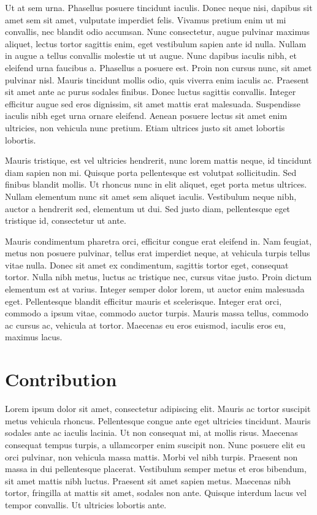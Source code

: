 Ut at sem urna. Phasellus posuere tincidunt iaculis. Donec neque nisi, dapibus sit amet sem sit amet, vulputate imperdiet felis. Vivamus pretium enim ut mi convallis, nec blandit odio accumsan. Nunc consectetur, augue pulvinar maximus aliquet, lectus tortor sagittis enim, eget vestibulum sapien ante id nulla. Nullam in augue a tellus convallis molestie ut ut augue. Nunc dapibus iaculis nibh, et eleifend urna faucibus a. Phasellus a posuere est. Proin non cursus nunc, sit amet pulvinar nisl. Mauris tincidunt mollis odio, quis viverra enim iaculis ac. Praesent sit amet ante ac purus sodales finibus. Donec luctus sagittis convallis. Integer efficitur augue sed eros dignissim, sit amet mattis erat malesuada. Suspendisse iaculis nibh eget urna ornare eleifend. Aenean posuere lectus sit amet enim ultricies, non vehicula nunc pretium. Etiam ultrices justo sit amet lobortis lobortis.

Mauris tristique, est vel ultricies hendrerit, nunc lorem mattis neque, id tincidunt diam sapien non mi. Quisque porta pellentesque est volutpat sollicitudin. Sed finibus blandit mollis. Ut rhoncus nunc in elit aliquet, eget porta metus ultrices. Nullam elementum nunc sit amet sem aliquet iaculis. Vestibulum neque nibh, auctor a hendrerit sed, elementum ut dui. Sed justo diam, pellentesque eget tristique id, consectetur ut ante.

Mauris condimentum pharetra orci, efficitur congue erat eleifend in. Nam feugiat, metus non posuere pulvinar, tellus erat imperdiet neque, at vehicula turpis tellus vitae nulla. Donec sit amet ex condimentum, sagittis tortor eget, consequat tortor. Nulla nibh metus, luctus ac tristique nec, cursus vitae justo. Proin dictum elementum est at varius. Integer semper dolor lorem, ut auctor enim malesuada eget. Pellentesque blandit efficitur mauris et scelerisque. Integer erat orci, commodo a ipsum vitae, commodo auctor turpis. Mauris massa tellus, commodo ac cursus ac, vehicula at tortor. Maecenas eu eros euismod, iaculis eros eu, maximus lacus.



\section{Contribution}

Lorem ipsum dolor sit amet, consectetur adipiscing elit. Mauris ac tortor suscipit metus vehicula rhoncus. Pellentesque congue ante eget ultricies tincidunt. Mauris sodales ante ac iaculis lacinia. Ut non consequat mi, at mollis risus. Maecenas consequat tempus turpis, a ullamcorper enim suscipit non. Nunc posuere elit eu orci pulvinar, non vehicula massa mattis. Morbi vel nibh turpis. Praesent non massa in dui pellentesque placerat. Vestibulum semper metus et eros bibendum, sit amet mattis nibh luctus. Praesent sit amet sapien metus. Maecenas nibh tortor, fringilla at mattis sit amet, sodales non ante. Quisque interdum lacus vel tempor convallis. Ut ultricies lobortis ante.

